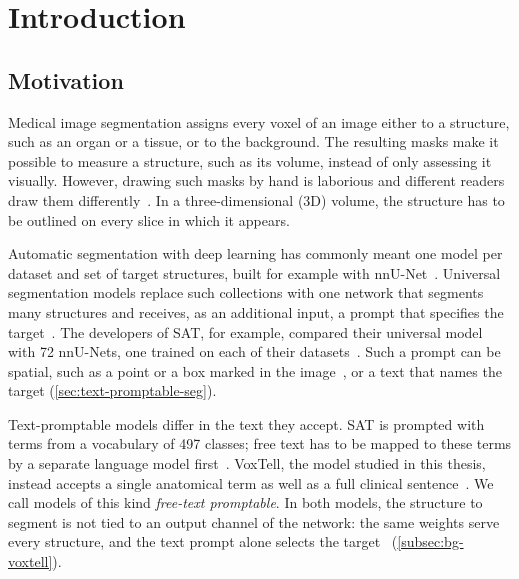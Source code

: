 %

\chapter{Introduction}
\label{chap:intro}

\section{Motivation}
\label{sec:intro-motivation}

Medical image segmentation assigns every voxel of an image either to a structure, such as an organ or a tissue, or to the background.
The resulting masks make it possible to measure a structure, such as its volume, instead of only assessing it visually. 
However, drawing such masks by hand is laborious and different readers draw them differently~\cite{desai2021skmtea}.
In a three-dimensional (3D) volume, the structure has to be outlined on every slice in which it appears.

Automatic segmentation with deep learning has commonly meant one model per dataset and set of target structures, built for example with nnU-Net~\cite{isensee2018nnunetselfadaptingframeworkunetbased}.
Universal segmentation models replace such collections with one network that segments many structures and receives, as an additional input, a prompt that specifies the target~\cite{zhao2025sat,rokuss2025voxtellfreetextpromptableuniversal}.
The developers of SAT, for example, compared their universal model with 72 nnU-Nets, one trained on each of their datasets~\cite{zhao2025sat}.
Such a prompt can be spatial, such as a point or a box marked in the image~\cite{Ma_2024,cheng2023sammed2d}, or a text that names the target (\cref{sec:text-promptable-seg}).

Text-promptable models differ in the text they accept.
SAT is prompted with terms from a vocabulary of 497 classes; free text has to be mapped to these terms by a separate language model first~\cite{zhao2025sat}.
VoxTell, the model studied in this thesis, instead accepts a single anatomical term as well as a full clinical sentence~\cite{rokuss2025voxtellfreetextpromptableuniversal}.
We call models of this kind \emph{free-text promptable}.
In both models, the structure to segment is not tied to an output channel of the network: the same weights serve every structure, and the text prompt alone selects the target~\cite[Sec.~4.5]{zhao2025sat}\cite[Sec.~3]{rokuss2025voxtellfreetextpromptableuniversal} (\cref{subsec:bg-voxtell}).

